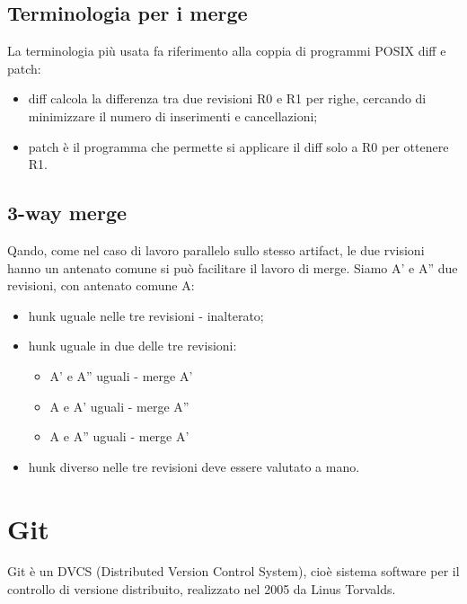 \documentclass[a4paper,12pt,titlepage,oneside]{book}
\begin{document}
\subsection{Terminologia per i merge}
La terminologia più usata fa riferimento alla coppia di programmi POSIX diff e patch:
\begin{itemize}
    \item diff calcola la differenza tra due revisioni R0 e R1 per righe, cercando di minimizzare il numero di inserimenti e cancellazioni;
    \item patch è il programma che permette si applicare il diff solo a R0 per ottenere R1.
\end{itemize}

\subsection{3-way merge}
Qando, come nel caso di lavoro parallelo sullo stesso artifact, le due rvisioni hanno un antenato comune si può facilitare il lavoro di merge.
Siamo A' e A'' due revisioni, con antenato comune A:
\begin{itemize}
    \item hunk uguale nelle tre revisioni - inalterato;
    \item hunk uguale in due delle tre revisioni:
    \begin{itemize}
        \item A' e A'' uguali - merge A'
        \item A e A' uguali - merge A''
        \item A e A'' uguali - merge A'
    \end{itemize} 
    \item hunk diverso nelle tre revisioni deve essere valutato a mano.
\end{itemize}

\section{Git}
Git è un DVCS (Distributed Version Control System), cioè sistema software per il controllo di versione distribuito, realizzato nel 2005 da Linus Torvalds.
\end{document}
